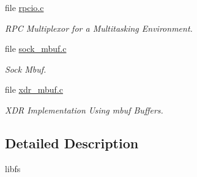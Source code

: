 \begin{DoxyCompactItemize}
file \mbox{\hyperlink{rpcio_8c}{rpcio.\+c}}
\begin{DoxyCompactList}\small\item\em R\+PC Multiplexor for a Multitasking Environment. \end{DoxyCompactList}\item 
file \mbox{\hyperlink{sock__mbuf_8c}{sock\+\_\+mbuf.\+c}}
\begin{DoxyCompactList}\small\item\em Sock Mbuf. \end{DoxyCompactList}\item 
file \mbox{\hyperlink{xdr__mbuf_8c}{xdr\+\_\+mbuf.\+c}}
\begin{DoxyCompactList}\small\item\em X\+DR Implementation Using mbuf Buffers. \end{DoxyCompactList}\end{DoxyCompactItemize}


\subsection{Detailed Description}
libfs 

